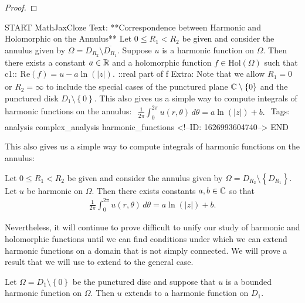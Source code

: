 \documentclass{memoir}
\begin{document}
\begin{proof}
	
\end{proof}

\begin{anki}
START
MathJaxCloze
Text: **Correspondence between Harmonic and Holomorphic on the Annulus**
Let \(0\leq R_1<R_2\) be given and consider the annulus given by \(\Omega = D_{R_2}\setminus \overline{D_{R_1}}\). Suppose \(u\) is a harmonic function on \(\Omega \). Then there exists a constant \(a \in \mathbb{R}\) and a holomorphic function \(f \in \textrm{Hol}(\Omega )\) such that
{{c1::\(\begin{align*}
        	\textrm{Re}(f) = u - a \ln(\left| z \right| ).
        \end{align*}\)::real part of f}} 
Extra: Note that we allow \(R_1=0\) or \(R_2=\infty\) to include the special cases of the punctured plane \(\mathbb{C}\setminus\left\{ 0 \right\} \) and the punctured disk \(D_1\setminus\left\{ 0 \right\} \).
This also gives us a simple way to compute integrals of harmonic functions on the annulus:
\(\begin{align*}
  	\frac{1}{2\pi }\int_{0}^{2\pi } u(r,\theta )\,d \theta  = a \ln(\left| z \right| ) + b.
  \end{align*}\)
Tags: analysis complex_analysis harmonic_functions
<!--ID: 1626993604740-->
END
\end{anki}

This also gives us a simple way to compute integrals of harmonic functions on the annulus:
\begin{cor}
	Let \(0\leq R_1<R_2\) be given and consider the annulus given by \(\Omega  = D_{R_2}\setminus\left\{ D_{R_1} \right\} \). Let \(u\) be harmonic on \(\Omega \). Then there exists constants \(a,b\in \mathbb{C}\) so that
	\begin{align*}
		\frac{1}{2\pi }\int_{0}^{2\pi } u(r,\theta )\,d \theta  = a \ln(\left| z \right| ) + b.
	\end{align*}
\end{cor}

Nevertheless, it will continue to prove difficult to unify our study of harmonic and holomorphic functions until we can find conditions under which we can extend harmonic functions on a domain that is not simply connected. We will prove a result that we will use to extend to the general case.
\begin{lemma}
	Let \(\Omega = D_1\setminus\left\{ 0 \right\} \) be the punctured disc and suppose that \(u\) is a bounded harmonic function on \(\Omega \). Then \(u\) extends to a harmonic function on \(D_1\).
\end{lemma}
\end{document}
